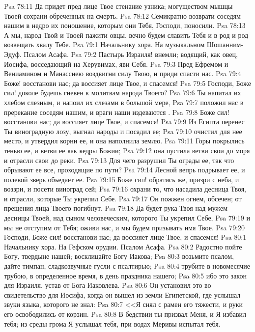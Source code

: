 \vs Psa 78:11 Да придет пред лице Твое стенание узника; могуществом мышцы Твоей сохрани обреченных на смерть.
\vs Psa 78:12 Семикратно возврати соседям нашим в недро их поношение, которым они Тебя, Господи, поносили.
\vs Psa 78:13 А мы, народ Твой и Твоей пажити овцы, вечно будем славить Тебя и в род и род возвещать хвалу Тебе.
\vs Psa 79:1 Начальнику хора. На музыкальном  Шошанним-Эдуф. Псалом Асафа.
\rsbpar\vs Psa 79:2 Пастырь Израиля! внемли; водящий, как овец, Иосифа, восседающий на Херувимах, яви Себя.
\vs Psa 79:3 Пред Ефремом и Вениамином и Манассиею воздвигни силу Твою, и приди спасти нас.
\vs Psa 79:4 Боже! восстанови нас; да воссияет лице Твое, и спасемся!
\vs Psa 79:5 Господи, Боже сил! доколе будешь гневен к молитвам народа Твоего?
\vs Psa 79:6 Ты напитал их хлебом слезным, и напоил их слезами в большой мере,
\vs Psa 79:7 положил нас в пререкание соседям нашим, и враги наши издеваются .
\vs Psa 79:8 Боже сил! восстанови нас; да воссияет лице Твое, и спасемся!
\vs Psa 79:9 Из Египта перенес Ты виноградную лозу, выгнал народы и посадил ее;
\vs Psa 79:10 очистил для нее место, и утвердил корни ее, и она наполнила землю.
\vs Psa 79:11 Горы покрылись тенью ее, и ветви ее как кедры Божии;
\vs Psa 79:12 она пустила ветви свои до моря и отрасли свои до реки.
\vs Psa 79:13 Для чего разрушил Ты ограды ее, так что обрывают ее все, проходящие по пути?
\vs Psa 79:14 Лесной вепрь подрывает ее, и полевой зверь объедает ее.
\vs Psa 79:15 Боже сил! обратись же, призри с неба, и воззри, и посети виноград сей;
\vs Psa 79:16 охрани то, что насадила десница Твоя, и отрасли, которые Ты укрепил Себе.
\vs Psa 79:17 Он пожжен огнем, обсечен; от прещения лица Твоего погибнут.
\vs Psa 79:18 Да будет рука Твоя над мужем десницы Твоей, над сыном человеческим, которого Ты укрепил Себе,
\vs Psa 79:19 и мы не отступим от Тебя; оживи нас, и мы будем призывать имя Твое.
\vs Psa 79:20 Господи, Боже сил! восстанови нас; да воссияет лице Твое, и спасемся!
\vs Psa 80:1 Начальнику хора. На Гефском орудии. Псалом Асафа.
\rsbpar\vs Psa 80:2 Радостно пойте Богу, твердыне нашей; восклицайте Богу Иакова;
\vs Psa 80:3 возьмите псалом, дайте тимпан, сладкозвучные гусли с псалтирью;
\vs Psa 80:4 трубите в новомесячие трубою, в определенное время, в день праздника нашего;
\vs Psa 80:5 ибо это закон для Израиля, устав от Бога Иаковлева.
\vs Psa 80:6 Он установил это во свидетельство для Иосифа, когда он вышел из земли Египетской, где услышал звуки языка, которого не знал:
\vs Psa 80:7 <<Я снял с рамен его тяжести, и руки его освободились от корзин.
\vs Psa 80:8 В бедствии ты призвал Меня, и Я избавил тебя; из среды грома Я услышал тебя, при водах Меривы испытал тебя.
